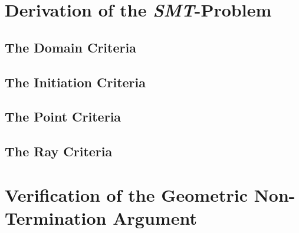 \section{Derivation of the \emph{SMT}-Problem}

\subsection{The Domain Criteria}

\subsection{The Initiation Criteria}

\subsection{The Point Criteria}

\subsection{The Ray Criteria}

\section{Verification of the Geometric Non-Termination Argument}
	 
